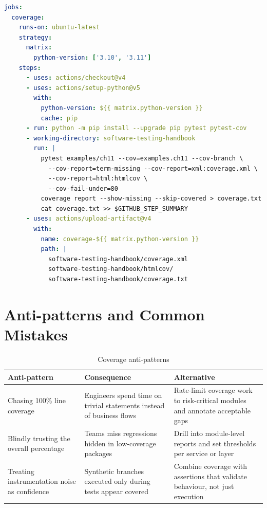 \begin{lstlisting}[language=yaml, caption={Coverage gate with artifacts and PR summary.}, label=lst:ch11-coverage-ci]
jobs:
  coverage:
    runs-on: ubuntu-latest
    strategy:
      matrix:
        python-version: ['3.10', '3.11']
    steps:
      - uses: actions/checkout@v4
      - uses: actions/setup-python@v5
        with:
          python-version: ${{ matrix.python-version }}
          cache: pip
      - run: python -m pip install --upgrade pip pytest pytest-cov
      - working-directory: software-testing-handbook
        run: |
          pytest examples/ch11 --cov=examples.ch11 --cov-branch \
            --cov-report=term-missing --cov-report=xml:coverage.xml \
            --cov-report=html:htmlcov \
            --cov-fail-under=80
          coverage report --show-missing --skip-covered > coverage.txt
          cat coverage.txt >> $GITHUB_STEP_SUMMARY
      - uses: actions/upload-artifact@v4
        with:
          name: coverage-${{ matrix.python-version }}
          path: |
            software-testing-handbook/coverage.xml
            software-testing-handbook/htmlcov/
            software-testing-handbook/coverage.txt
\end{lstlisting}

\section{Anti-patterns and Common Mistakes}
\begin{table}[h]
\centering
\caption{Coverage anti-patterns}
\label{tab:coverage-antipatterns}
\begin{tabular}{p{4cm}p{4cm}p{5cm}}
\toprule
Anti-pattern & Consequence & Alternative \\
\midrule
Chasing 100\% line coverage & Engineers spend time on trivial statements instead of business flows & Rate-limit coverage work to risk-critical modules and annotate acceptable gaps \\
Blindly trusting the overall percentage & Teams miss regressions hidden in low-coverage packages & Drill into module-level reports and set thresholds per service or layer \\
Treating instrumentation noise as confidence & Synthetic branches executed only during tests appear covered & Combine coverage with assertions that validate behaviour, not just execution \\
\bottomrule
\end{tabular}
\end{table}

